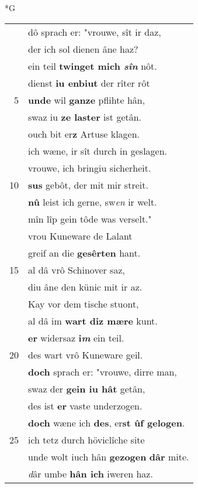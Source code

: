 \documentclass[8pt,a4paper,notitlepage]{article}
\begin{document}
\newpage
\begin{table}[ht]
\begin{minipage}[t]{0.5\linewidth}
\small
\begin{center}*G
\end{center}
\begin{tabular}{rl}
 & dô sprach er: "vrouwe, sît ir daz,\\ 
 & der ich sol dienen âne haz?\\ 
 & ein teil \textbf{twinget mich \textit{sîn}} nôt.\\ 
 & dienst \textbf{iu enbiut} der rîter rôt\\ 
5 & \textbf{unde} wil \textbf{ganze} pflihte hân,\\ 
 & swaz iu \textbf{ze laster} ist getân.\\ 
 & ouch bit er\textbf{z} Artuse klagen.\\ 
 & ich wæne, ir sît durch in geslagen.\\ 
 & vrouwe, ich bringiu sicherheit.\\ 
10 & \textbf{sus} gebôt, der mit mir streit.\\ 
 & \textbf{nû} leist ich gerne, sw\textit{en} ir welt.\\ 
 & mîn lîp gein tôde was verselt."\\ 
 & vrou Kuneware de Lalant\\ 
 & greif an die \textbf{gesêrten} hant.\\ 
15 & al dâ vrô Schinover saz,\\ 
 & diu âne den künic mit ir az.\\ 
 & Kay vor dem tische stuont,\\ 
 & al dâ im \textbf{wart diz mære} kunt.\\ 
 & \textbf{er} widersaz \textbf{i\textit{m}} ein teil.\\ 
20 & des wart vrô Kuneware geil.\\ 
 & \textbf{doch} sprach er: "vrouwe, dirre man,\\ 
 & swaz der \textbf{gein iu hât} getân,\\ 
 & des ist \textbf{er} vaste underzogen.\\ 
 & \textbf{doch} wæne ich \textbf{des}, er\textbf{st ûf gelogen}.\\ 
25 & ich tetz durch höviclîche site\\ 
 & unde wolt iuch hân \textbf{gezogen} \textbf{dâr} mite.\\ 
 & \textit{d}âr umbe \textbf{hân ich} iweren haz.\\ 

\end{tabular}
\end{minipage}
\end{table}
\end{document}
